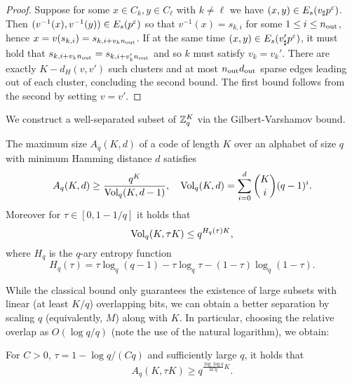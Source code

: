 \begin{proof}
Suppose for some $x\in C_k,y\in C_\ell$ with $k\neq \ell$ we have $(x,y) \in E_s(v_\sharp p^\varepsilon)$. Then $(v^{-1}(x),v^{-1}(y)) \in E_s(p^\varepsilon)$ so that $v^{-1}(x)=s_{k,i}$ for some $1\le i\le n_{\operatorname{out}}$, hence $x=v(s_{k,i})=s_{k,i+v_k n_{\operatorname{out}}}$. If at the same time $(x,y) \in E_s(v'_\sharp p^\varepsilon)$, it must hold that $s_{k,i+v_k n_{\operatorname{out}}} = s_{k,i+v_k' n_{\operatorname{out}}}$ and so $k$ must satisfy $v_k=v_k'$. There are exactly $K-d_H(v,v')$ such clusters and at most $n_{\operatorname{out}}d_{\operatorname{out}}$ sparse edges leading out of each cluster, concluding the second bound. The first bound follows from the second by setting $v=v'$.
\end{proof}
We construct a well-separated subset of $\mathbb{Z}_q^K$ via the Gilbert-Varshamov bound.

\begin{lemma}\label{thm:gv}
The maximum size $A_q(K,d)$ of a code of length $K$ over an alphabet of size $q$ with minimum Hamming distance $d$ satisfies
\begin{equation*}
A_q(K,d) \ge \frac{q^K}{\operatorname{Vol}_q(K,d-1)}, \quad \operatorname{Vol}_q(K,d)=\sum_{i=0}^d\binom{K}{i}(q-1)^i.
\end{equation*}
Moreover for $\tau\in [0,1-1/q]$ it holds that
\begin{equation*}
\operatorname{Vol}_q(K,\tau K) \le q^{H_q(\tau)K},
\end{equation*}
where $H_q$ is the $q$-ary entropy function
\begin{equation*}
H_q(\tau) = \tau\log_q(q-1) -\tau\log_q \tau -(1-\tau)\log_q(1-\tau).
\end{equation*}
\end{lemma}

While the classical bound only guarantees the existence of large subsets with linear (at least $K/q$) overlapping bits, we can obtain a better separation by scaling $q$ (equivalently, $M$) along with $K$. In particular, choosing the relative overlap as $O(\log q/q)$ (note the use of the natural logarithm), we obtain:
\begin{lemma}
For $C>0$, $\tau = 1-\log q/(Cq)$ and sufficiently large $q$, it holds that
\begin{equation}\label{eq:gv}
A_q\left(K,\tau K\right) \ge q^{\frac{\log\log q}{2Cq}K}.
\end{equation}
\end{lemma}

